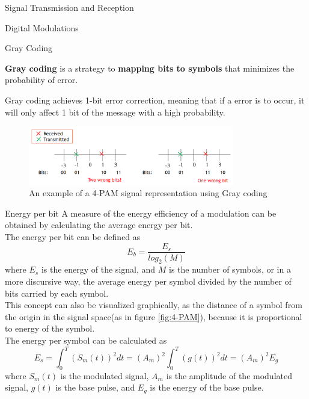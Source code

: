 \begin{section}{Signal Transmission and Reception}
\begin{subsection}{Digital Modulations}
\begin{subsubsection}{Gray Coding}
      \begin{boxH}
        \textbf{Gray coding} is a strategy to \textbf{mapping bits to symbols} that minimizes the
        probability of error.
      \end{boxH}
      Gray coding achieves 1-bit error correction, meaning that if a error is to occur, it will only
      affect 1 bit of the message with a high probability.\\
      \begin{figure}[h]
        \centering
        \includegraphics[width=0.8\textwidth]{img/wireless/gray coding.png}
        \caption{An example of a 4-PAM signal representation using Gray coding}
        \label{fig:GrayCode}
      \end{figure}
    \end{subsubsection}
    \begin{subsubsection}{Energy per bit}
      A measure of the energy efficiency of a modulation can be obtained by calculating the average
      energy per bit.\\
      The energy per bit can be defined as 
      \begin{equation}
        E_b=\frac{E_s}{log_2(M)}
      \end{equation}
      where $E_s$ is the energy of the signal, and $M$ is the number of symbols, or in a more
      discursive way, the average energy per symbol divided by the number of bits carried by 
      each symbol.\\
      This concept can also be visualized graphically, as the distance of a symbol from the origin
      in the signal space(as in figure \ref{fig:4-PAM}), because it is proportional to 
      energy of the symbol.\\

      The energy per symbol can be calculated as
      \begin{equation}
        E_s=\int_{0}^{T} (S_m(t))^2 dt= (A_m)^2 \int_{0}^{T} (g(t))^2 dt= (A_m)^2 E_g
      \end{equation}
      where $S_m(t)$ is the modulated signal, $A_m$ is the amplitude of the modulated signal, $g(t)$
      is the base pulse, and $E_g$ is the energy of the base pulse.\\


\end{subsubsection}
\end{subsection}
\end{section}

